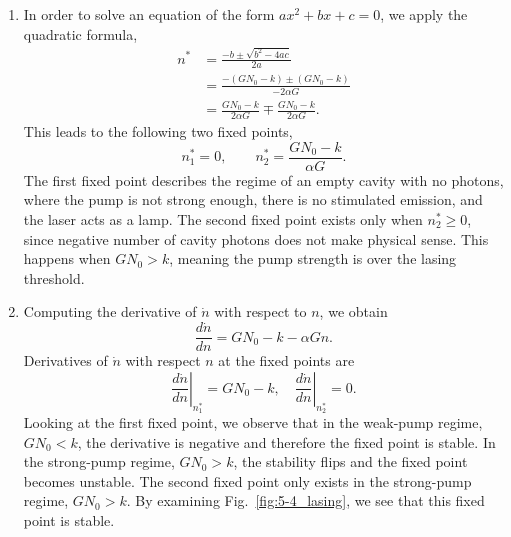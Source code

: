\begin{solution}
\begin{enumerate}[label=(\alph*)]
    \item In order to solve an equation of the form $ax^2+bx+c=0$, we apply the quadratic formula,
    \begin{align*}
        n^* & = \frac{-b\pm\sqrt{b^2-4ac}}{2a} \\
        & = \frac{-(GN_0-k) \pm (GN_0-k)}{-2\alpha G} \\
	    & = \frac{GN_0-k}{2\alpha G} \mp \frac{GN_0-k}{2\alpha G}.
    \end{align*}
    This leads to the following two fixed points,
    \begin{equation*}
        n^*_1 = 0, \qquad n^*_2=\frac{GN_0-k}{\alpha G}.
    \end{equation*}
    The first fixed point describes the regime of an empty cavity with no photons, where the pump is not strong enough, there is no stimulated emission, and the laser acts as a lamp. The second fixed point exists only when $n_2^*\geq0$, since negative number of cavity photons does not make physical sense. This happens when $GN_0>k$, meaning the pump strength is over the lasing threshold.
    \item Computing the derivative of $\dot{n}$ with respect to $n$, we obtain
    \begin{equation*} 
        \frac{d\dot{n}}{dn}=GN_0-k-\alpha Gn.
    \end{equation*}
    Derivatives of $\dot{n}$ with respect $n$ at the fixed points are
    \begin{equation*}
        \left.\frac{d\dot{n}}{dn}\right|_{n^*_1}=GN_0-k, \quad \left.\frac{d\dot{n}}{dn}\right|_{n^*_2}=0.
    \end{equation*}
    Looking at the first fixed point, we observe that in the weak-pump regime, $GN_0<k$, the derivative is negative and therefore the fixed point is stable. In the strong-pump regime, $GN_0>k$, the stability flips and the fixed point becomes unstable.
    The second fixed point only exists in the strong-pump regime, $GN_0>k$. By examining Fig.~\ref{fig:5-4_lasing}, we see that this fixed point is stable.
\end{enumerate}
\end{solution}

